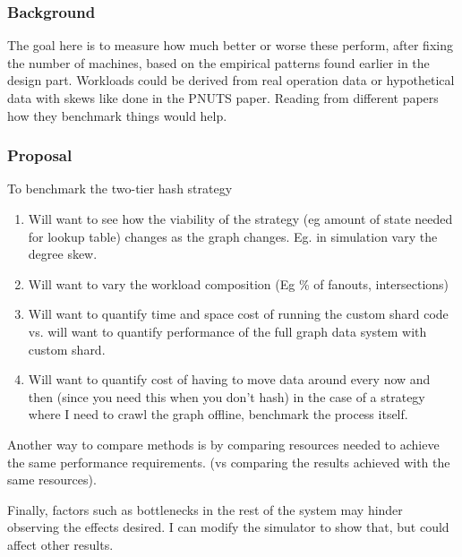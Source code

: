\documentclass{article}
\begin{document}
\subsubsection{Background}
The goal here is to measure how much better or worse these perform, after fixing the number of machines, based on the empirical patterns found earlier in the design part.  Workloads could be derived from real operation data or hypothetical data with skews like done in the PNUTS paper. Reading from different papers how they benchmark things would help.
\subsubsection{Proposal}


To benchmark the two-tier hash strategy 

\begin{enumerate}
\item Will want to see how the viability of the strategy (eg amount of state needed for lookup table) changes as the graph changes. Eg. in simulation vary the degree skew.
\item Will want to vary the workload composition (Eg \% of fanouts, intersections)
\item Will want to quantify time and space cost of running the custom shard code vs. will want to quantify performance of the full graph data system  with custom shard.
\item Will want to quantify cost of having to move data around every now and then (since you need this when you don't hash)
in the case of a strategy where I need to crawl the graph offline, benchmark the process itself.
\end{enumerate}

Another way to compare methods is by comparing resources needed to achieve the same  performance requirements. (vs comparing the results achieved with the same resources).

Finally, factors such as bottlenecks in the rest of the system may hinder observing the effects desired. I can modify the simulator to show that, but could affect other results.
\nocite{*}

\end{document}
